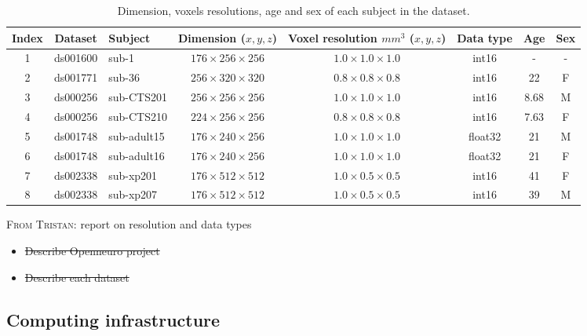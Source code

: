 \documentclass{article}
\newcommand{\TG}[1]{\color{blue}\textsc{From Tristan:} #1\color{black}\xspace}
\begin{document}
\begin{table}
    \begin{center}
        \begin{tabular}{ c|c|l|c|c|c|c|c}
            Index & Dataset  & Subject     & Dimension ($x,y,z$)         & Voxel resolution $mm^3$ ($x,y,z$) & Data type & Age  & Sex \\
            \hline
            1     & ds001600 & sub-1       & $176 \times 256 \times 256$ & $1.0 \times 1.0 \times 1.0$       & int16     & -    & -   \\
            2     & ds001771 & sub-36      & $256 \times 320 \times 320$ & $0.8 \times 0.8 \times 0.8$       & int16     & 22   & F   \\
            3     & ds000256 & sub-CTS201  & $256 \times 256 \times 256$ & $1.0 \times 1.0 \times 1.0$       & int16     & 8.68 & M   \\
            4     & ds000256 & sub-CTS210  & $224 \times 256 \times 256$ & $0.8 \times 0.8 \times 0.8$       & int16     & 7.63 & F   \\
            5     & ds001748 & sub-adult15 & $176 \times 240 \times 256$ & $1.0 \times 1.0 \times 1.0$       & float32   & 21   & M   \\
            6     & ds001748 & sub-adult16 & $176 \times 240 \times 256$ & $1.0 \times 1.0 \times 1.0$       & float32   & 21   & F   \\
            7     & ds002338 & sub-xp201   & $176 \times 512 \times 512$ & $1.0 \times 0.5 \times 0.5$       & int16     & 41   & F   \\
            8     & ds002338 & sub-xp207   & $176 \times 512 \times 512$ & $1.0 \times 0.5 \times 0.5$       & int16     & 39   & M   \\
        \end{tabular}
    \end{center}
    \caption{Dimension, voxels resolutions, age and sex of each subject in the dataset.}
    \label{table:dataset_info}
\end{table}


\TG{report on resolution and data types}

\begin{itemize}
    \item \st{Describe Openneuro project}
    \item \st{Describe each dataset}
\end{itemize}

\subsection{Computing infrastructure}
\end{document}

